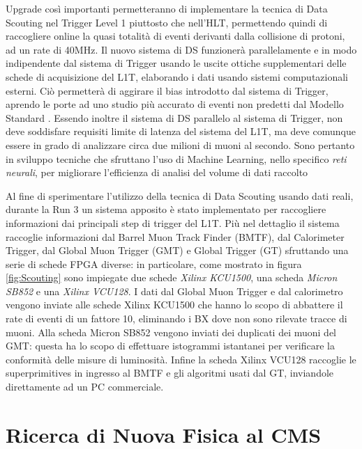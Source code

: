 Upgrade così importanti permetteranno di implementare la tecnica di Data Scouting nel Trigger Level 1 piuttosto che nell'HLT, permettendo quindi di raccogliere online la quasi totalità di eventi derivanti dalla collisione di protoni, ad un rate di 40MHz. Il nuovo sistema di DS funzionerà parallelamente e in modo indipendente dal sistema di Trigger usando le uscite ottiche supplementari delle schede di acquisizione del L1T, elaborando i dati usando sistemi computazionali esterni. Ciò permetterà di aggirare il bias introdotto dal sistema di Trigger, aprendo le porte ad uno studio più accurato di eventi non predetti dal Modello Standard \cite{MasterThesisNicLai}. Essendo inoltre il sistema di DS parallelo al sistema di Trigger, non deve soddisfare requisiti limite di latenza del sistema del L1T, ma deve comunque essere in grado di analizzare circa due milioni di muoni al secondo. Sono pertanto in sviluppo tecniche che sfruttano l'uso di Machine Learning, nello specifico \textit{reti neurali}, per migliorare l'efficienza di analisi del volume di dati raccolto \cite{MasterThesisNicLai}

Al fine di sperimentare l'utilizzo della tecnica di Data Scouting usando dati reali, durante la Run 3 un sistema apposito è stato implementato per raccogliere informazioni dai principali step di trigger del L1T. Più nel dettaglio il sistema raccoglie informazioni dal Barrel Muon Track Finder (BMTF), dal Calorimeter Trigger, dal Global Muon Trigger (GMT) e Global Trigger (GT) sfruttando una serie di schede FPGA diverse: in particolare, come mostrato in figura \ref{fig:Scouting} sono impiegate due schede \textit{Xilinx KCU1500}, una scheda \textit{Micron SB852} e una \textit{Xilinx VCU128}. \newline
I dati dal Global Muon Trigger e dal calorimetro vengono inviate alle schede Xilinx KCU1500 che hanno lo scopo di abbattere il rate di eventi di un fattore 10, eliminando i BX dove non sono rilevate tracce di muoni. Alla scheda Micron SB852 vengono inviati dei duplicati dei muoni del GMT: questa ha lo scopo di effettuare istogrammi istantanei per verificare la conformità delle misure di luminosità. Infine la scheda Xilinx VCU128 raccoglie le superprimitives in ingresso al BMTF e gli algoritmi usati dal GT, inviandole direttamente ad un PC commerciale.






\section{Ricerca di Nuova Fisica al CMS}
\label{sec:NewPhysics}

